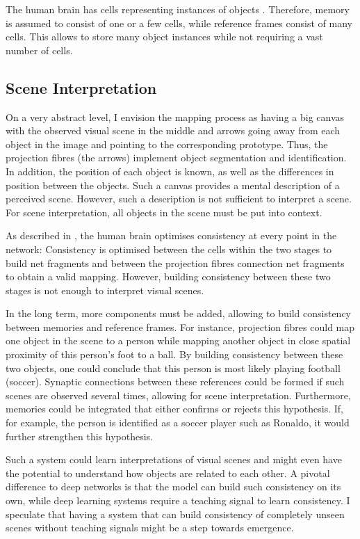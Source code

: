 The human brain has cells representing instances of objects .
Therefore, memory is assumed to consist of one or a few cells, while reference frames consist of many cells.
This allows to store many object instances while not requiring a vast number of cells.


\subsection{Scene Interpretation}
On a very abstract level, I envision the mapping process as having a big canvas with the observed visual scene in the middle and arrows going away from each object in the image and pointing to the corresponding prototype. Thus, the projection fibres (the arrows) implement object segmentation and identification.
In addition, the position of each object is known, as well as the differences in position between the objects.
Such a canvas provides a mental description of a perceived scene. However, such a description is not sufficient to interpret a scene. For scene interpretation, all objects in the scene must be put into context.

As described in , the human brain optimises consistency at every point in the network: Consistency is optimised between the cells within the two stages to build net fragments and between the projection fibres connection net fragments to obtain a valid mapping.
However, building consistency between these two stages is not enough to interpret visual scenes.

In the long term, more components must be added, allowing to build consistency between memories and reference frames.
For instance, projection fibres could map one object in the scene to a person while mapping another object in close spatial proximity of this person's foot to a ball. By building consistency between these two objects, one could conclude that this person is most likely playing football (soccer). Synaptic connections between these references could be formed if such scenes are observed several times, allowing for scene interpretation.
Furthermore, memories could be integrated that either confirms or rejects this hypothesis. If, for example, the person is identified as a soccer player such as Ronaldo, it would further strengthen this hypothesis.

Such a system could learn interpretations of visual scenes and might even have the potential to understand how objects are related to each other. A pivotal difference to deep networks is that the model can build such consistency on its own, while deep learning systems require a teaching signal to learn consistency.
I speculate that having a system that can build consistency of completely unseen scenes without teaching signals might be a step towards emergence.


